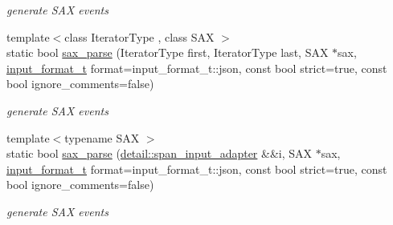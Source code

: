 \begin{DoxyCompactItemize}
\begin{DoxyCompactList}\small\item\em generate S\+AX events \end{DoxyCompactList}\item 
{\footnotesize template$<$class Iterator\+Type , class S\+AX $>$ }\\static bool \hyperlink{classnlohmann_1_1basic__json_ab62241c2694a054818edf2f66d72f113}{sax\+\_\+parse} (Iterator\+Type first, Iterator\+Type last, S\+AX $\ast$sax, \hyperlink{namespacenlohmann_1_1detail_aa554fc6a11519e4f347deb25a9f0db40}{input\+\_\+format\+\_\+t} format=input\+\_\+format\+\_\+t\+::json, const bool strict=true, const bool ignore\+\_\+comments=false)
\begin{DoxyCompactList}\small\item\em generate S\+AX events \end{DoxyCompactList}\item 
{\footnotesize template$<$typename S\+AX $>$ }\\static bool \hyperlink{classnlohmann_1_1basic__json_aef9ef0a817ecde8bf270653e8706c150}{sax\+\_\+parse} (\hyperlink{classnlohmann_1_1detail_1_1span__input__adapter}{detail\+::span\+\_\+input\+\_\+adapter} \&\&i, S\+AX $\ast$sax, \hyperlink{namespacenlohmann_1_1detail_aa554fc6a11519e4f347deb25a9f0db40}{input\+\_\+format\+\_\+t} format=input\+\_\+format\+\_\+t\+::json, const bool strict=true, const bool ignore\+\_\+comments=false)
\begin{DoxyCompactList}\small\item\em generate S\+AX events \end{DoxyCompactList}\end{DoxyCompactItemize}
